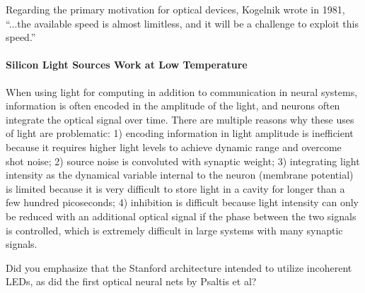 \vspace{3em}
Regarding the primary motivation for optical devices, Kogelnik wrote in 1981, ``...the available speed is almost limitless, and it will be a challenge to exploit this speed.'' \cite{ko1981}

\paragraph{Silicon Light Sources Work at Low Temperature}

\cite{enpo1985}

\cite{brha1986}




\vspace{3em}
When using light for computing in addition to communication in neural systems, information is often encoded in the amplitude of the light, and neurons often integrate the optical signal over time. There are multiple reasons why these uses of light are problematic: 1) encoding information in light amplitude is inefficient because it requires higher light levels to achieve dynamic range and overcome shot noise; 2) source noise is convoluted with synaptic weight; 3) integrating light intensity as the dynamical variable internal to the neuron (membrane potential) is limited because it is very difficult to store light in a cavity for longer than a few hundred picoseconds; 4) inhibition is difficult because light intensity can only be reduced with an additional optical signal if the phase between the two signals is controlled, which is extremely difficult in large systems with many synaptic signals.

\vspace{3em}

\cite{fepe2019}

\cite{pena2018} 

\cite{fesh2017}

\cite{wuso2014}

\cite{mebo2015}

\cite{tafe2019}

\cite{rokr2009}



\vspace{3em}
Did you emphasize that the Stanford architecture intended to utilize incoherent LEDs, as did the first optical neural nets by Psaltis et al?